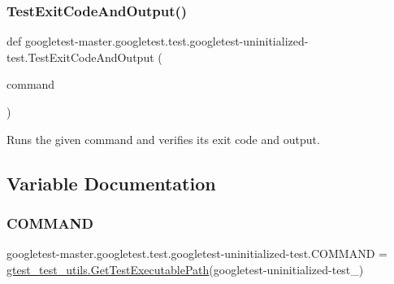 \subsubsection{\texorpdfstring{TestExitCodeAndOutput()}{TestExitCodeAndOutput()}}
{\footnotesize\ttfamily def googletest-\/master.\+googletest.\+test.\+googletest-\/uninitialized-\/test.\+Test\+Exit\+Code\+And\+Output (\begin{DoxyParamCaption}\item[{}]{command }\end{DoxyParamCaption})}

\begin{DoxyVerb}Runs the given command and verifies its exit code and output.\end{DoxyVerb}
 

\subsection{Variable Documentation}
\mbox{\label{namespacegoogletest-master_1_1googletest_1_1test_1_1googletest-uninitialized-test_abdc655624c6be49a767d6f61a400db1b}} 
\subsubsection{\texorpdfstring{COMMAND}{COMMAND}}
{\footnotesize\ttfamily googletest-\/master.\+googletest.\+test.\+googletest-\/uninitialized-\/test.\+C\+O\+M\+M\+A\+ND = \mbox{\hyperlink{namespacegoogletest-master_1_1googletest_1_1test_1_1gtest__test__utils_a78bbc69ac699e750a6a29188caa643c4}{gtest\+\_\+test\+\_\+utils.\+Get\+Test\+Executable\+Path}}(\textquotesingle{}googletest-\/uninitialized-\/test\+\_\+\textquotesingle{})}

